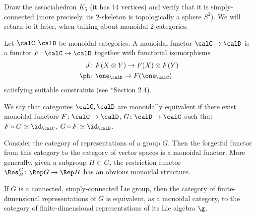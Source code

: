 \begin{exercise}\label{ec:K5}
  Draw the associahedron $K_5$ (it has 14 vertices) and verify that it is
  simply-connected (more precisely, its 2-skeleton is topologically a sphere
  $S^2$). We will return to it later, when talking about monoidal 2-categories.
\end{exercise}

\begin{definition}\label{d:monoidal_functor}
  Let $\calC, \calD$ be monoidal categories. A monoidal functor
  $\calC\to \calD$ is a functor $F\colon\calC\to\calD$ together
  with functorial isomorphisms
  \begin{align*}
    J&\colon F(X\otimes Y)\to F(X)\otimes F(Y)\\
    \ph&\colon \one_\calD\to F(\one_\calC)
  \end{align*}
  satisfying suitable constraints (see *{Section 2.4}).

  We say that categories $\calC, \calD$ are monoidally equivalent
  if there exist monoidal functors $F\colon \calC\to \calD$, $G\colon \calD\to
  \calC$ such that $F\circ G\simeq \id_\calC$, $G\circ F \simeq \id_\calD$.
\end{definition}


\begin{example}
  Consider the category of representations of a group $G$. Then the
  forgetful functor from this category to the category of vector
  spaces is a monoidal functor. More generally, given
  a subgroup $H\subset G$, the restriction functor
  $\Res^G_H\colon \Rep G\to\Rep H$ has an
  obvious monoidal structure.
\end{example}
\begin{example}
  If $G$ is a connected, simply-connected Lie group, then the category
  of finite-dimensional representations of $G$ is equivalent, as a
  monoidal category, to the category of finite-dimensional
  representations of its Lie
  algebra $\g$.
\end{example}

